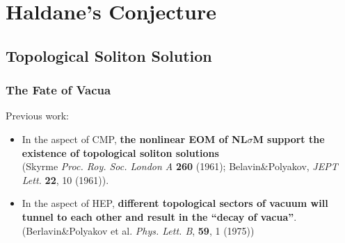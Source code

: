 \documentclass[10pt,aspectratio=43,xcolor=x11names,t]{beamer}%
\begin{document}
\section{Haldane's Conjecture}
	\subsection{Topological Soliton Solution}
		\begin{frame}\frametitle{The Fate of Vacua}
			Previous work:
			\begin{itemize}
				\item In the aspect of CMP, \textbf{the nonlinear EOM of NL$\sigma$M support the existence of topological soliton solutions}\\
				({\scriptsize Skyrme \textit{Proc. Roy. Soc. London A} \textbf{260} (1961); Belavin\&Polyakov, \textit{JEPT Lett.} \textbf{22}, 10 (1961)}).
				\item In the aspect of HEP, \textbf{different topological sectors of vacuum will tunnel to each other and result in the ``decay of vacua''}.\\
				({\scriptsize Berlavin\&Polyakov et al. \textit{Phys. Lett. B}, \textbf{59}, 1 (1975)})
			\end{itemize}
		\end{frame}
\end{document}
